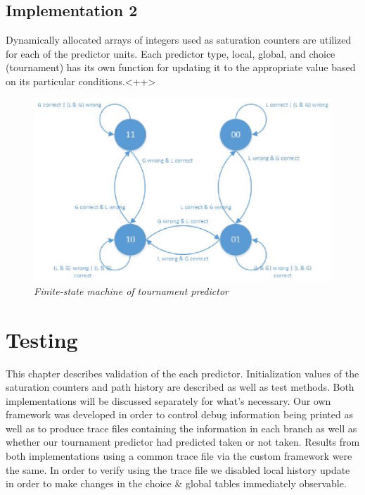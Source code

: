 \documentclass[]{report}   %
\begin{document}
\section{Implementation 2}
\par{Dynamically allocated arrays of integers used as saturation counters are utilized for each of the predictor units.
Each predictor type, local, global, and choice (tournament) has its own function for updating it to the appropriate value based on its particular conditions.}<++>
\begin{center}
  \begin{figure}[h]
    \label{state-machine}
    \includegraphics[width=5in]{CPT_FSM.eps}
    \caption*{\textit{Finite-state machine of tournament predictor}}
  \end{figure}
\end{center}

\chapter{Testing}
\par{This chapter describes validation of the each predictor.
Initialization values of the saturation counters and path history are described as well as test methods.
Both implementations will be discussed separately for what's necessary.
Our own framework was developed in order to control debug information being printed as well as to produce trace files containing the information in each branch as well as whether our tournament predictor had predicted taken or not taken.
Results from both implementations using a common trace file via the custom framework were the same.
In order to verify using the trace file we disabled local history update in order to make changes in the choice \& global tables immediately observable.}
\end{document}
